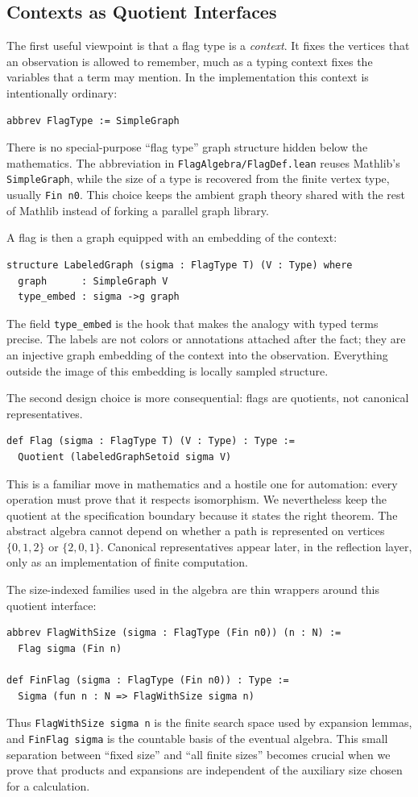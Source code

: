\documentclass{article}
\newcommand{\lean}[1]{\texttt{#1}}
\begin{document}
\subsection{Contexts as Quotient Interfaces}

The first useful viewpoint is that a flag type is a \emph{context}.  It fixes
the vertices that an observation is allowed to remember, much as a typing
context fixes the variables that a term may mention.  In the implementation
this context is intentionally ordinary:
\begin{lstlisting}
abbrev FlagType := SimpleGraph
\end{lstlisting}
There is no special-purpose ``flag type'' graph structure hidden below the
mathematics.  The abbreviation in \lean{FlagAlgebra/FlagDef.lean} reuses
Mathlib's \lean{SimpleGraph}, while the size of a type is recovered from the
finite vertex type, usually \lean{Fin n0}.  This choice keeps the ambient graph
theory shared with the rest of Mathlib instead of forking a parallel graph
library.

A flag is then a graph equipped with an embedding of the context:
\begin{lstlisting}
structure LabeledGraph (sigma : FlagType T) (V : Type) where
  graph      : SimpleGraph V
  type_embed : sigma ->g graph
\end{lstlisting}
The field \lean{type\_embed} is the hook that makes the analogy with typed
terms precise.  The labels are not colors or annotations attached after the
fact; they are an injective graph embedding of the context into the observation.
Everything outside the image of this embedding is locally sampled structure.

The second design choice is more consequential: flags are quotients, not
canonical representatives.
\begin{lstlisting}
def Flag (sigma : FlagType T) (V : Type) : Type :=
  Quotient (labeledGraphSetoid sigma V)
\end{lstlisting}
This is a familiar move in mathematics and a hostile one for automation: every
operation must prove that it respects isomorphism.  We nevertheless keep the
quotient at the specification boundary because it states the right theorem.
The abstract algebra cannot depend on whether a path is represented on
vertices $\{0,1,2\}$ or $\{2,0,1\}$.  Canonical representatives appear later,
in the reflection layer, only as an implementation of finite computation.

The size-indexed families used in the algebra are thin wrappers around this
quotient interface:
\begin{lstlisting}
abbrev FlagWithSize (sigma : FlagType (Fin n0)) (n : N) :=
  Flag sigma (Fin n)

def FinFlag (sigma : FlagType (Fin n0)) : Type :=
  Sigma (fun n : N => FlagWithSize sigma n)
\end{lstlisting}
Thus \lean{FlagWithSize sigma n} is the finite search space used by expansion
lemmas, and \lean{FinFlag sigma} is the countable basis of the eventual algebra.
This small separation between ``fixed size'' and ``all finite sizes'' becomes
crucial when we prove that products and expansions are independent of the
auxiliary size chosen for a calculation.
\end{document}
